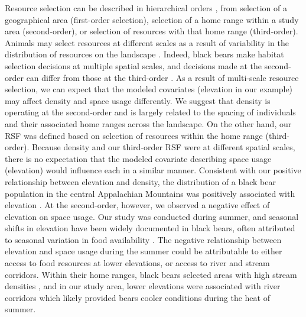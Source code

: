 Resource selection can be described in
hierarchical orders \citep{johnson:1980}, from selection of a geographical
area (first-order selection), selection of a home range within a study
area (second-order), or selection of resources with that home range
(third-order).  Animals may select resources at different scales as a
result of variability in the distribution of resources on the
landscape \citep{mayor_etal:2009}.  Indeed, black bears make habitat
selection decisions at multiple spatial scales, and decisions made at
the second-order can differ from those at the third-order
\citep{lyons_etal:2003, sadeghpour_ginnett:2011}.
  As a result of multi-scale
resource selection, we can expect that the modeled covariates
(elevation in our example) may affect density and space usage
differently.  We suggest that density is operating at the second-order
and is largely related to the spacing of individuals and their
associated home ranges across the landscape.  On the other hand, our RSF was defined
based on selection of resources within the home range (third-order).
Because density and our third-order RSF were at different spatial
scales, there is no expectation that the modeled covariate describing
space usage (elevation) would influence each in a similar manner.
Consistent with our positive relationship between elevation and
density, the distribution of a black bear population in the central
Appalachian Mountains was positively associated with elevation \citep{frary_etal:2011}.
 At the second-order, however, we observed a negative
effect of elevation on space usage.  Our study was conducted during
summer, and seasonal shifts in elevation have been widely documented
in black bears, often attributed to seasonal variation in food
availability \citep{reynolds_beecham:1980,
graber_white:1983}.
 The negative relationship between elevation and space
usage during the summer could be attributable to either access to food
resources at lower elevations, or access to river and stream
corridors.  Within their home ranges, black bears selected areas with
high stream densities \citep{fecske_etal:2002}, and in our study area,
lower elevations were associated with river corridors which likely
provided bears cooler conditions during the heat of summer.






